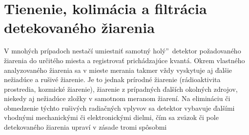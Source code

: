 \documentclass[../../main.tex]{subfiles}
\begin{document}
\section{Tienenie, kolimácia a filtrácia detekovaného žiarenia}

V mnohých prípadoch nestačí umiestniť samotný \quotedblbase holý\textquotedblright ~detektor požadovaného žiarenia do určitého miesta a registrovať prichádzajúce kvantá. Okrem vlastného analyzovaného žiarenia sa v mieste merania takmer vždy vyskytuje aj ďalšie nežiadúce a rušivé žiarenie. Je to jednak prírodné žiarenie (rádioaktivita prostredia, kozmické žiarenie), žiarenie z prípadných ďalších okolných zdrojov, niekedy aj nežiadúce zložky v samotnom meranom žiarení. Na elimináciu či obmedzenie týchto rušivých radiačných vplyvov sa detektor vybavuje ďalšími vhodnými mechanickými či elektronickými dielmi, čím sa zväzok či pole detekovaného žiarenia upraví v zásade tromi spôsobmi
\end{document}

